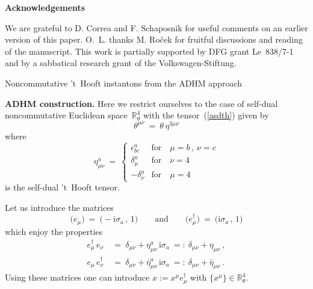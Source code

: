 \documentclass[a4paper,11pt]{article}
\makeatletter
\renewcommand{\section}{\@startsection{section}{1}{0pt}{\medskipamount}
{\medskipamount}{\large\bf}}
\numberwithin{equation}{section}
\def\de{\delta}
\def\eps{\epsilon}
\def\h{\eta}
\def\th{\theta}
\def\s{\sigma}
\newcommand{\R}{\mathbb R}
\def\i{\mbox{i}}
\def\+{\dagger}
\makeatother
\begin{document}
{\vfill\eject
\noindent
{\large{\bf Acknowledgements}}

\smallskip
\noindent
We are grateful to D. Correa and F. Schaposnik for useful comments on
an earlier version of this paper.
O.~L. thanks M. Ro\v cek for fruitful discussions 
and reading of the manuscript.
This work is partially supported by DFG grant Le~838/7-1
and by a sabbatical research grant of the Volkswagen-Stiftung.

\bigskip

\setcounter{section}{0}
\renewcommand{\thesection}{\Alph{section}}
\section{Noncommutative 't~Hooft instantons from the ADHM approach}

\noindent
{\bf ADHM construction.}
Here we restrict ourselves to the case of self-dual noncommutative
Euclidean space~$\R^4_\th$ with the tensor~(\ref{asdth}) given by
\begin{equation}
\th^{\mu\nu}\ =\ \th\,\h^{3\mu\nu}
\end{equation}
where
\begin{equation}
\eta^a_{\mu\nu}\ =\ \begin{cases}
\eps^a_{bc} & \textrm{for} \quad \mu =b\,,\ \nu =c \\
\de^a_\mu  & \textrm{for} \quad \nu =4 \\
-\de^a_\nu   & \textrm{for} \quad \mu =4 \end{cases}
\end{equation}
is the self-dual 't~Hooft tensor.

Let us introduce the matrices
\begin{equation}
\bigl(e_\mu\bigr)\ =\ \bigl(-\i\s_a\,,\,1\bigr)
\qquad\textrm{and}\qquad
\bigl(e^\+_\mu\bigr)\ =\ \bigl(\i\s_a\,,\,1\bigr)
\end{equation}
which enjoy the properties
\begin{align}
e^\+_\mu\,e_\nu\ &=\ \de_{\mu\nu} + \h^a_{\mu\nu}\,\i\s_a\
=:\ \de_{\mu\nu} + \h_{\mu\nu} \ ,\\ 
e_\mu\,e^\+_\nu\ &=\ \de_{\mu\nu} + \bar{\h}^a_{\mu\nu}\,\i\s_a\
=:\ \de_{\mu\nu} + \bar{\h}_{\mu\nu} \ .
\end{align}
Using these matrices one can introduce $x:=x^\mu e^\+_\mu$
with $\{x^\mu\}\in\R^4_\th$.

}
\end{document}
